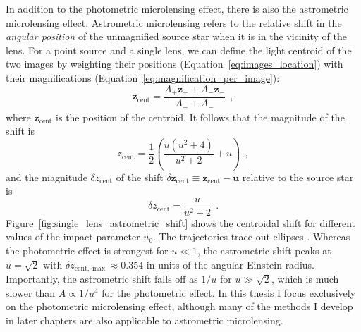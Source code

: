 \documentclass[12pt,dvipsnames]{report}
\renewcommand{\vec}[1]{\boldsymbol{\mathbf{#1}}}
\newcommand{\hquad}{~~}
\begin{document}
In addition to the photometric microlensing effect, there is also the astrometric
microlensing effect. Astrometric microlensing refers to the relative shift in 
the \emph{angular position} of the unmagnified source star when it is in the vicinity of the lens.
For a point source and a single lens, we can
define the light centroid of the two images by weighting their positions
(Equation~\ref{eq:images_location}) with their magnifications
(Equation~\ref{eq:magnification_per_image}):
\begin{equation}
    \vec z_\mathrm{cent}=\frac{A_+\vec z_+ + A_-\vec z_-}{A_+ + A_-}
    \hquad,
    \label{eq:centroid_single_lens}
\end{equation}
where $\vec z_\mathrm{cent}$ is the position of the centroid. It follows that the magnitude of the
shift is
\begin{equation}
    z_\mathrm{cent}=\frac{1}{2}\left(\frac{u(u^2 + 4)}{u^2+2}+u\right)
    \hquad,
\end{equation}
and the magnitude $\delta z_\mathrm{cent}$ of the shift
$\delta \vec z_\mathrm{cent}\equiv\vec z_\mathrm{cent} - \vec u$ relative to the source star is
\begin{equation}
    \delta z_\mathrm{cent} = \frac{u}{u^2 + 2}
    \hquad.
\end{equation}
Figure~\ref{fig:single_lens_astrometric_shift} shows the centroidal shift for
different values of the impact parameter $u_0$. The trajectories trace out ellipses
\citep{1995ApJ...453...37W}.
Whereas the photometric effect is
strongest for
$u\ll 1$, the astrometric shift peaks at $u=\sqrt{2}$ with
$\delta z_{\mathrm{cent},\max}\approx 0.354$ in units of the angular Einstein radius.
Importantly, the astrometric shift falls off as $1/u$ for $u\gg \sqrt{2}$, which is
much slower than $A\propto 1/u^4$ for the photometric effect.
In this thesis I focus exclusively on the photometric microlensing effect, although many 
of the methods I develop in later chapters are also applicable to astrometric microlensing.
\end{document}
